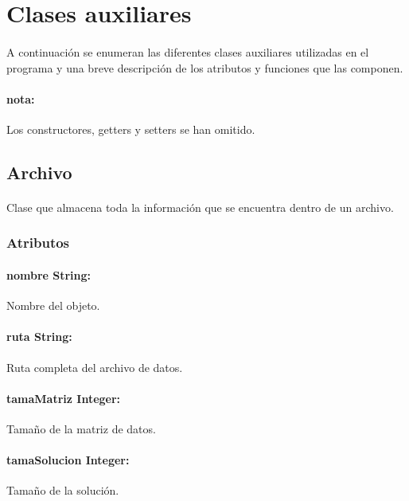 \documentclass{article}
\begin{document}
	\section{Clases auxiliares}
	
	\paragraph{} A continuación se enumeran las diferentes clases auxiliares utilizadas en el programa y una breve descripción de los atributos y funciones que las componen.
	
	\paragraph{nota:}Los constructores, getters y setters se han omitido.
	
	\subsection{Archivo}
	
	\paragraph{}Clase que almacena toda la información que se encuentra dentro de un archivo.
	
	\subsubsection{Atributos}
	
	\paragraph{nombre String:}Nombre del objeto.
	
	\paragraph{ruta String:}Ruta completa del archivo de datos.
	
	\paragraph{tamaMatriz Integer:}Tamaño de la matriz de datos.
	
	\paragraph{tamaSolucion Integer:}Tamaño de la solución.
	
\end{document}
